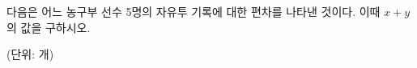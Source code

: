 다음은 어느 농구부 선수 5명의 자유투 기록에 대한 편차를 나타낸 것이다. 이때 $x+y$의 값을 구하시오.\par\noindent\hfill{\footnotesize (단위: 개)}
